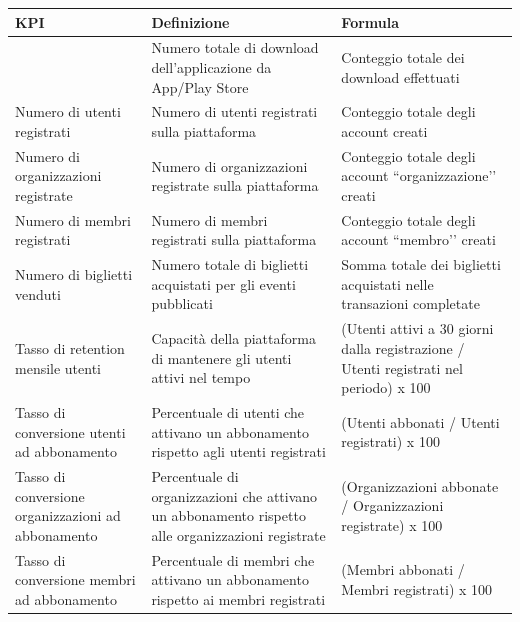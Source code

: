 \documentclass[11pt,a4paper]{article}
\newcounter{none}  %
\begin{document}
{\def\LTcaptype{none} %
\begin{longtable}[]{@{}>{\raggedright\arraybackslash}p{\dimexpr(\linewidth-6\tabcolsep)/3\relax}>{\raggedright\arraybackslash}p{\dimexpr(\linewidth-6\tabcolsep)/3\relax}>{\raggedright\arraybackslash}p{\dimexpr(\linewidth-6\tabcolsep)/3\relax}@{}}
\toprule\noalign{}
\endhead
\bottomrule\noalign{}
\endlastfoot
\rowcolor{brandbg}\textbf{{KPI}} & \textbf{{Definizione}} & \textbf{{Formula}} \\
\midrule
{Numero di download dell’app} & {Numero totale di download dell’applicazione da App/Play Store} & {Conteggio totale dei download effettuati} \\
\midrule
{Numero di }{utenti registrati} & {Numero di utenti registrati sulla piattaforma} & {Conteggio totale degli account creati} \\
\midrule
{Numero di organizzazioni registrate} & {Numero di organizzazioni registrate sulla piattaforma} & {Conteggio totale degli account ``organizzazione’’ creati} \\
\midrule
{Numero di membri registrati} & {Numero di membri registrati sulla piattaforma} & {Conteggio totale degli account ``membro’’ creati} \\
\midrule
{Numero di biglietti venduti} & {Numero totale di biglietti acquistati per gli eventi pubblicati} & {Somma totale dei biglietti acquistati nelle transazioni completate} \\
\midrule
{Tasso di retention mensile utenti} & {Capacità della piattaforma di mantenere gli utenti attivi nel tempo} & {(Utenti attivi a 30 giorni dalla registrazione / Utenti registrati nel periodo) x 100} \\
\midrule
{Tasso di conversione utenti ad abbonamento} & {Percentuale di utenti che attivano un abbonamento rispetto agli utenti registrati} & {(Utenti abbonati / Utenti registrati) x 100} \\
\midrule
{Tasso di conversione organizzazioni ad abbonamento} & {Percentuale di organizzazioni che attivano un abbonamento rispetto alle organizzazioni registrate} & {(Organizzazioni abbonate / Organizzazioni registrate) x 100} \\
\midrule
{Tasso di conversione membri ad abbonamento} & {Percentuale di membri che attivano un abbonamento rispetto ai membri registrati} & {(Membri abbonati / Membri registrati) x 100} \\
\end{longtable}
}

{}
\end{document}
